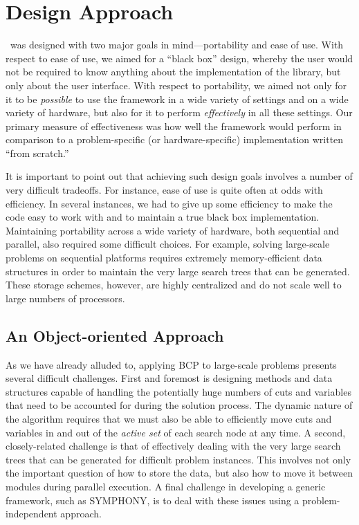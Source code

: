 \section{Design Approach}
\label{design}

\BB\ was designed with two major goals in mind---portability and
ease of use. With respect to ease of use, we aimed for a ``black box''
design, whereby the user would not be required to know anything about
the implementation of the library, but only about the user interface.
With respect to portability, we aimed not only for it to be {\em
possible} to use the framework in a wide variety of settings and on a
wide variety of hardware, but also for it to perform {\em effectively} in all
these settings. Our primary measure of effectiveness was
how well the framework would perform in comparison to a problem-specific
(or hardware-specific) implementation written ``from scratch.''

It is important to point out that achieving such design goals involves
a number of very difficult tradeoffs. For instance, ease of use is quite
often at odds with efficiency. In several instances, we had to give up
some efficiency to make the code easy to work with and to maintain a
true black box implementation. Maintaining portability across a wide
variety of hardware, both sequential and parallel, also required some
difficult choices. For example, solving large-scale problems on
sequential platforms requires extremely memory-efficient data
structures in order to maintain the very large search trees that can
be generated. These storage schemes, however, are highly centralized
and do not scale well to large numbers of processors. 

\subsection{An Object-oriented Approach}

As we have already alluded to, applying BCP to large-scale problems
presents several difficult challenges. First and foremost is designing
methods and data structures capable of handling the potentially huge
numbers of cuts and variables that need to be accounted for during the
solution process. The dynamic nature of the algorithm requires that we
must also be able to efficiently move cuts and variables in and out of
the {\em active set} of each search node at any time. A second,
closely-related challenge is that of effectively dealing with the very
large search trees that can be generated for difficult problem
instances. This involves not only the important question of how to
store the data, but also how to move it between modules during
parallel execution. A final challenge in developing a generic
framework, such as SYMPHONY, is to deal with these issues using a
problem-independent approach.

